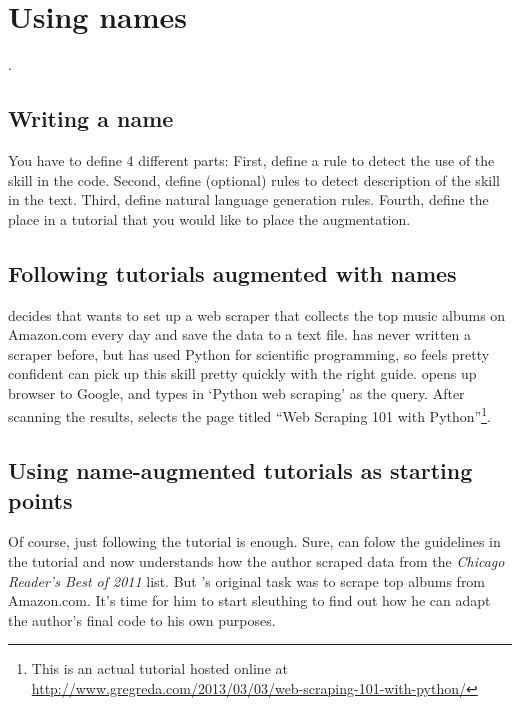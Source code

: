 \section{Using \Glspl{name}}

.

\subsection{Writing a \gls{name}}

You have to define 4 different parts:
First, define a rule to detect the use of the skill in the code.
Second, define (optional) rules to detect description of the skill in the text.
Third, define natural language generation rules.
Fourth, define the place in a tutorial that you would like to place the augmentation.

\subsection{Following tutorials augmented with \glspl{name}}

\user{} decides that \userpro{} wants to set up a web scraper that collects the top music albums on Amazon.com every day and save the data to a text file.
\userpro{} has never written a scraper before, but has used Python for scientific programming, so \userpro{} feels pretty confident \userpro{} can pick up this skill pretty quickly with the right guide.
\userpro{} opens up \userpos{} browser to Google, and types in `Python web scraping' as the query.
After scanning the results, \userpro{} selects the page titled ``Web Scraping 101 with Python''\footnote
{This is an actual tutorial hosted online at \url{http://www.gregreda.com/2013/03/03/web-scraping-101-with-python/}}.


\subsection{Using \gls{name}-augmented tutorials as starting points}

Of course, just following the tutorial is enough.
Sure, \user{} can folow the guidelines in the tutorial and now understands how the author scraped data from the \emph{Chicago Reader's Best of 2011} list.
But \user's original task was to scrape top albums from Amazon.com.
It's time for him to start sleuthing to find out how he can adapt the author's final code to his own purposes.

